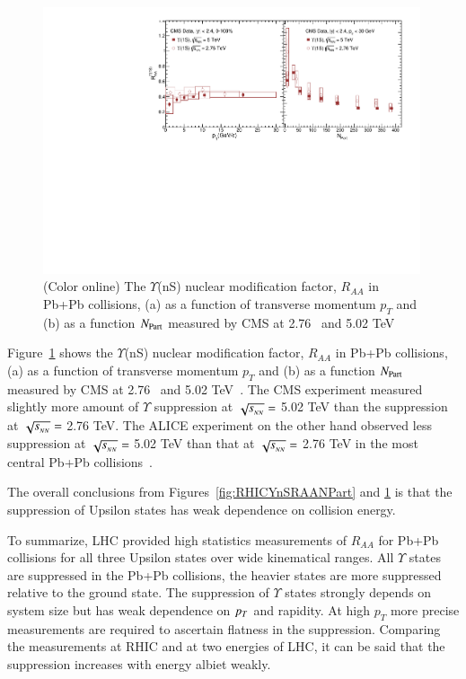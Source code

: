 \begin{figure}
  \includegraphics[width=0.99\textwidth]{Figures/Fig9_CMS_Y1SRAAPtNPart_En.pdf}
  \caption{(Color online) The $\Upsilon$(nS) nuclear modification factor, $R_{AA}$ in
    Pb+Pb collisions,
    (a) as a function of transverse momentum $p_{T}$
    and (b) as a function $N_{\rm Part}$ measured by CMS 
    at 2.76~\cite{Khachatryan:2016xxp} and 5.02 TeV~\cite{CMS:2018zza}
  }
  \label{fig:LHCYnSRAAenergy}
\end{figure}




Figure~\ref{fig:LHCYnSRAAenergy} shows 
the $\Upsilon$(nS) nuclear modification factor, $R_{AA}$ in Pb+Pb collisions,
(a) as a function of transverse momentum $p_{T}$
  and (b) as a function $N_{\rm Part}$ measured by CMS
    at 2.76~\cite{Khachatryan:2016xxp} and 5.02 TeV~\cite{CMS:2018zza}. 
 The CMS experiment measured slightly more amount of $\Upsilon$ suppression at
 $\sqrt{s_{_{NN}}} =$ 5.02 TeV than the suppression at $\sqrt{s_{_{NN}}} =$ 2.76 TeV.
 The ALICE experiment on the other hand observed less
suppression at $\sqrt{s_{_{NN}}} =$ 5.02 TeV than that at $\sqrt{s_{_{NN}}} =$ 2.76 TeV 
in the most central Pb+Pb collisions~\cite{ALICE:2018wzm,Abelev:2014nua}.

The overall conclusions from Figures~\ref{fig:RHICYnSRAANPart} and 
\ref{fig:LHCYnSRAAenergy} is that the suppression of Upsilon states
has weak dependence on collision energy. 
  
To summarize, LHC provided high statistics measurements of $R_{AA}$ for
Pb+Pb collisions for all three Upsilon states over wide kinematical ranges.
All $\Upsilon$ states are suppressed in the Pb+Pb collisions,
the heavier states are more suppressed relative to the ground state.
The suppression of $\Upsilon$ states strongly depends on system size but
has weak dependence on $p_{T}$ and rapidity. At high $p_T$ more precise
measurements are required to ascertain flatness in the suppression. 
Comparing the measurements at RHIC and at two energies of LHC, it can be
said that the suppression increases with energy albiet weakly. 

